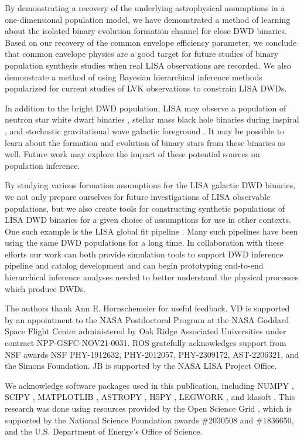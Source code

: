 \documentclass[twocolumn]{aastex631}
\newcommand*{\citepOSG}{\citep{osg07,osg09}}
\begin{document}
By demonstrating a recovery of the underlying astrophysical assumptions
    in a one-dimensional population model,
    we have demonstrated a method of learning about the isolated binary evolution
    formation channel for close DWD binaries.
Based on our recovery of the common envelope efficiency parameter,
    we conclude that common envelope physics are a good target for
    future studies of binary population synthesis studies
    when real LISA observations are recorded.
We also demonstrate a method of using
    Bayesian hierarchical inference methods popularized for current studies of LVK
    observations to constrain LISA DWDs.

In addition to the bright DWD population,
    LISA may observe a population of neutron star white dwarf binaries
    \citep{Nelemans2001,Moore2023,Korol2023NS},
    stellar mass black hole binaries during inspiral
    \citep{Sesana2016},
    and stochastic gravitational wave galactic foreground
    \citep{Karnesis2021}.
It may be possible to learn about the formation
    and evolution of binary stars from these binaries as well.
Future work may explore the impact of these potential sources
    on population inference.

By studying various formation assumptions for the LISA galactic DWD binaries,
    we not only prepare ourselves for future
    investigations of LISA observable populations,
    but we also create tools for constructing synthetic populations of LISA DWD binaries
    for a given choice of assumptions for use in other contexts.
One such example is the LISA global fit pipeline
\citep{TysonGlobalFit2023,GaoGlobalFit2023,FinchGlobalFit2023,
    LackeosGlobalFit2023,KatzGlobalFit2024,StrubGlobalFit2024}.
Many such pipelines have been using the same DWD populations for a long time.
In collaboration with these efforts our work can both provide simulation tools 
    to support DWD inference pipeline and catalog development and can begin 
    prototyping end-to-end hierarchical inference analyses needed to 
    better understand the physical processes which produce DWDs.
 

\begin{acknowledgments}
The authors thank Ann E. Hornschemeier for useful feedback.
VD is supported by an appointment to the NASA Postdoctoral Program at the NASA Goddard Space Flight Center administered by Oak Ridge Associated Universities under contract NPP-GSFC-NOV21-0031.
ROS  gratefully acknowledges support from NSF awards NSF PHY-1912632, PHY-2012057, PHY-2309172, AST-2206321, and the Simons Foundation.
JB is supported by the NASA LISA Project Office.

We acknowledge software packages used in this publication,
    including
    NUMPY \citep{harris2020array}, SCIPY \citep{2020SciPy-NMeth}, 
    MATPLOTLIB \citep{Hunter_2007}, 
    ASTROPY \citep{astropy:2013,astropy:2018}, 
    H5PY \citep{collette_python_hdf5_2014},
    LEGWORK \citep{LEGWORK},
and ldasoft \cite{ldasoft}.
This research was done using resources provided by the 
    Open Science Grid \citepOSG,
    which is supported by the National
    Science Foundation awards \#2030508 and \#1836650,
    and the U.S. Department of Energy's Office of Science. 
\end{acknowledgments}



\end{document}
